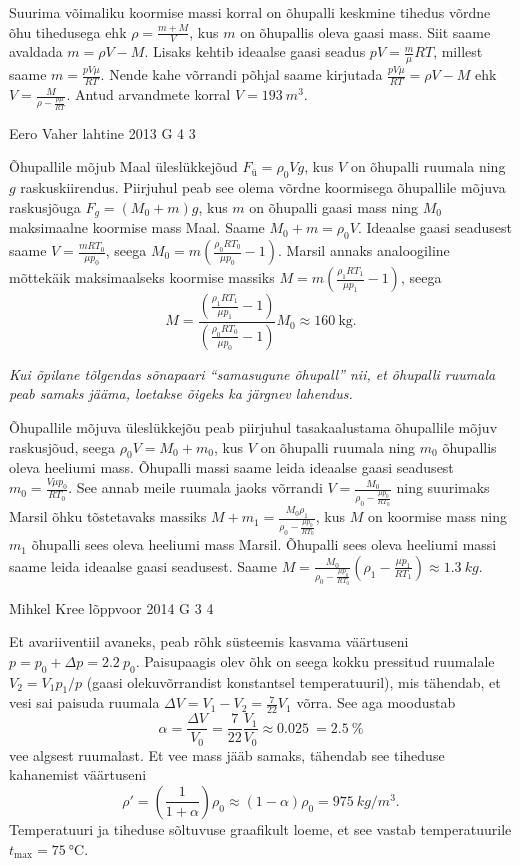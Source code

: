 \documentclass[11pt, twoside]{article}
\begin{document}
{{\ifSolution
Suurima võimaliku koormise massi korral on õhupalli keskmine tihedus võrdne õhu tihedusega ehk $\rho=\frac{m+M}{V}$, kus $m$ on õhupallis oleva gaasi mass. Siit saame avaldada $m=\rho V-M$. Lisaks kehtib ideaalse gaasi seadus $pV=\frac{m}{\mu}RT$, millest saame $m=\frac{pV\mu}{RT}$. Nende kahe võrrandi põhjal saame kirjutada $\frac{pV\mu}{RT}=\rho V-M$ ehk $V=\frac{M}{\rho-\frac{p\mu}{RT}}$. Antud arvandmete korral $V=\SI{193}{m^3}$.
\fi
}

{Eero Vaher} %
{lahtine} %
{2013} %
{G 4} %
{3} %
{

\ifSolution
Õhupallile mõjub Maal üleslükkejõud $F_{ü}=\rho_0Vg$, kus $V$ on õhupalli ruumala ning $g$ raskuskiirendus. Piirjuhul peab see olema võrdne koormisega õhupallile mõjuva raskusjõuga $F_g=(M_0+m)g$, kus $m$ on õhupalli gaasi mass ning $M_0$ maksimaalne koormise mass Maal. Saame $M_0+m=\rho_0V$. Ideaalse gaasi seadusest saame $V=\frac{mRT_0}{\mu p_0}$, seega $M_0=m(\frac{\rho_0 RT_0}{\mu p_0}-1)$. Marsil annaks analoogiline mõttekäik maksimaalseks koormise massiks $M=m(\frac{\rho_1RT_1}{\mu p_1}-1)$, seega \[M=\frac{(\frac{\rho_1RT_1}{\mu p_1}-1)}{(\frac{\rho_0RT_0}{\mu p_0}-1)}M_0\approx \SI{160}{\kilogram}.\]

{\em Kui õpilane tõlgendas sõnapaari ``samasugune õhupall'' nii, et õhupalli ruumala peab samaks jääma, loetakse õigeks ka järgnev lahendus.}

Õhupallile mõjuva üleslükkejõu peab piirjuhul tasakaalustama õhupallile mõjuv raskusjõud, seega $\rho_0 V=M_0+m_0$, kus $V$ on õhupalli ruumala ning $m_0$ õhupallis oleva heeliumi mass. Õhupalli massi saame leida ideaalse gaasi seadusest $m_0=\frac{V\mu p_0}{RT_0}$. See annab meile ruumala jaoks võrrandi $V=\frac{M_0}{\rho_0-\frac{\mu p_0}{RT_0}}$ ning suurimaks Marsil õhku tõstetavaks massiks $M+m_1=\frac{M_0\rho_1}{\rho_0-\frac{\mu p_0}{RT_0}}$, kus $M$ on koormise mass ning $m_1$ õhupalli sees oleva heeliumi mass Marsil. Õhupalli sees oleva heeliumi massi saame leida ideaalse gaasi seadusest. Saame $M=\frac{M_0}{\rho_0-\frac{\mu p_0}{RT_0}}(\rho_1-\frac{\mu p_1}{RT_1})\approx \SI{1,3}{kg}$.
\fi
}

{Mihkel Kree} %
{lõppvoor} %
{2014} %
{G 3} %
{4} %
{

\ifSolution
Et avariiventiil avaneks, peab rõhk süsteemis kasvama väärtuseni $p=p_0+\Delta p = \SI{2.2}{}p_0$. Paisupaagis olev õhk on seega kokku pressitud ruumalale $V_2=V_1 p_1/p$ (gaasi olekuvõrrandist konstantsel temperatuuril), mis tähendab, et vesi sai paisuda ruumala $\Delta V = V_1-V_2 = \frac{7}{22}V_1$ võrra. See aga moodustab \[\alpha = \frac{\Delta V}{V_0}= \frac{7}{22}\frac{V_1}{V_0}\approx \SI{0.025}{} =  \SI{2.5}{}\%\] vee algsest ruumalast. Et vee mass jääb samaks, tähendab see tiheduse kahanemist väärtuseni \[\rho'=\left(\frac{1}{1+\alpha}\right)\rho_0\approx(1-\alpha)\rho_0= \SI{975}{kg/m^3}.\]
Temperatuuri ja tiheduse sõltuvuse graafikult loeme, et see vastab temperatuurile $t_\text{max}=\SI{75}{\celsius}$.
\fi
}

}
\end{document}
